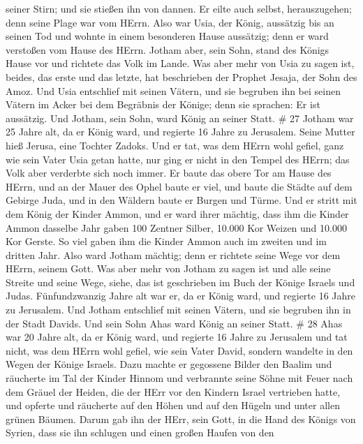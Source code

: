seiner Stirn; und sie stießen ihn von dannen. Er eilte auch selbst,
herauszugehen; denn seine Plage war vom HErrn.  Also war
Usia, der König, aussätzig bis an seinen Tod und wohnte in einem
besonderen Hause aussätzig; denn er ward verstoßen vom Hause des HErrn.
Jotham aber, sein Sohn, stand des Königs Hause vor und richtete das Volk
im Lande.  Was aber mehr von Usia zu sagen ist, beides, das
erste und das letzte, hat beschrieben der Prophet Jesaja, der Sohn des
Amoz.  Und Usia entschlief mit seinen Vätern, und sie
begruben ihn bei seinen Vätern im Acker bei dem Begräbnis der Könige;
denn sie sprachen: Er ist aussätzig. Und Jotham, sein Sohn, ward König
an seiner Statt. \# 27  Jotham war 25 Jahre alt, da er König
ward, und regierte 16 Jahre zu Jerusalem. Seine Mutter hieß Jerusa, eine
Tochter Zadoks.  Und er tat, was dem HErrn wohl gefiel, ganz
wie sein Vater Usia getan hatte, nur ging er nicht in den Tempel des
HErrn; das Volk aber verderbte sich noch immer.  Er baute
das obere Tor am Hause des HErrn, und an der Mauer des Ophel baute er
viel,  und baute die Städte auf dem Gebirge Juda, und in den
Wäldern baute er Burgen und Türme.  Und er stritt mit dem
König der Kinder Ammon, und er ward ihrer mächtig, dass ihm die Kinder
Ammon dasselbe Jahr gaben 100 Zentner Silber, 10.000 Kor Weizen und
10.000 Kor Gerste. So viel gaben ihm die Kinder Ammon auch im zweiten
und im dritten Jahr.  Also ward Jotham mächtig; denn er
richtete seine Wege vor dem HErrn, seinem Gott.  Was aber
mehr von Jotham zu sagen ist und alle seine Streite und seine Wege,
siehe, das ist geschrieben im Buch der Könige Israels und Judas.
 Fünfundzwanzig Jahre alt war er, da er König ward, und
regierte 16 Jahre zu Jerusalem.  Und Jotham entschlief mit
seinen Vätern, und sie begruben ihn in der Stadt Davids. Und sein Sohn
Ahas ward König an seiner Statt. \# 28  Ahas war 20 Jahre
alt, da er König ward, und regierte 16 Jahre zu Jerusalem und tat nicht,
was dem HErrn wohl gefiel, wie sein Vater David,  sondern
wandelte in den Wegen der Könige Israels. Dazu machte er gegossene
Bilder den Baalim  und räucherte im Tal der Kinder Hinnom
und verbrannte seine Söhne mit Feuer nach dem Gräuel der Heiden, die der
HErr vor den Kindern Israel vertrieben hatte,  und opferte
und räucherte auf den Höhen und auf den Hügeln und unter allen grünen
Bäumen.  Darum gab ihn der HErr, sein Gott, in die Hand des
Königs von Syrien, dass sie ihn schlugen und einen großen Haufen von den
